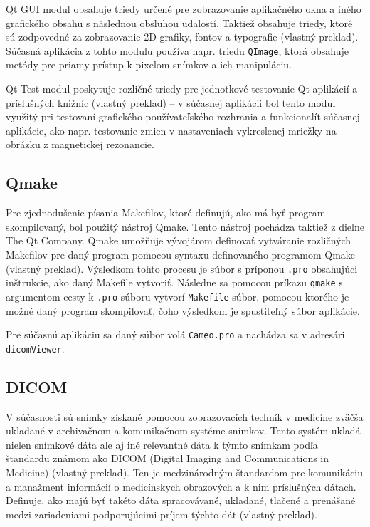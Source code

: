 Qt GUI modul obsahuje triedy určené pre zobrazovanie aplikačného okna a iného grafického obsahu s následnou obsluhou udalostí. Taktiež obsahuje triedy, ktoré sú zodpovedné za zobrazovanie 2D grafiky, fontov a typografie \cite{qtgui_description} (vlastný preklad).
Súčasná aplikácia z tohto modulu používa napr. triedu \texttt{QImage}, ktorá obsahuje metódy pre priamy prístup k pixelom snímkov a ich manipuláciu. \newline

Qt Test modul poskytuje rozličné triedy pre jednotkové testovanie Qt aplikácií a príslušných knižníc \cite{qttest_description} (vlastný preklad) -- v súčasnej aplikácii bol tento modul využitý pri testovaní grafického používateľského rozhrania a funkcionalít súčasnej aplikácie, ako napr. testovanie zmien v nastaveniach vykreslenej mriežky na obrázku z magnetickej rezonancie.

\subsection {Qmake}\label{qmake}
Pre zjednodušenie písania Makefilov, ktoré definujú, ako má byť program skompilovaný, bol použitý nástroj Qmake. Tento nástroj pochádza taktiež z dielne The Qt Company. Qmake umožňuje vývojárom definovať vytváranie rozličných Makefilov pre daný program pomocou syntaxu definovaného programom Qmake \cite{qmake_description} (vlastný preklad). Výsledkom tohto procesu je súbor s príponou \texttt{.pro} obsahujúci inštrukcie, ako daný Makefile vytvoriť. Následne sa pomocou príkazu \texttt{qmake} s argumentom cesty k \texttt{.pro} súboru vytvorí \texttt{Makefile} súbor, pomocou ktorého je možné daný program skompilovať, čoho výsledkom je spustiteľný súbor aplikácie.

Pre súčasnú aplikáciu sa daný súbor volá \texttt{Cameo.pro} a nachádza sa v adresári \texttt{dicomViewer}.

\subsection {DICOM}\label{dicom}
V súčasnosti sú snímky získané pomocou zobrazovacích techník v medicíne zväčša ukladané v archivačnom a komunikačnom systéme snímkov. Tento systém ukladá nielen snímkové dáta ale aj iné relevantné dáta k týmto snímkam podľa štandardu známom ako DICOM (Digital Imaging and Communications in Medicine) \cite{Varma_2012} (vlastný preklad). Ten je medzinárodným štandardom pre komunikáciu a manažment informácií o medicínskych obrazových a k nim príslušných dátach. Definuje, ako majú byť takéto dáta spracovávané, ukladané, tlačené a prenášané medzi zariadeniami podporujúcimi príjem týchto dát \cite{about_dicomlibrary} (vlastný preklad).


